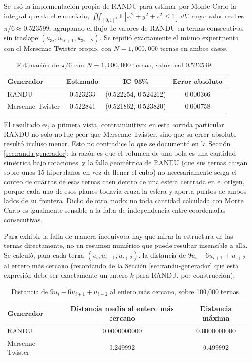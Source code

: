 \documentclass[11pt]{article}
\begin{document}
Se usó la implementación propia de RANDU para estimar por Monte Carlo la integral que da el enunciado, $\iiint_{[0,1]^3} \mathbf{1}[x^2+y^2+z^2\le 1]\,dV$, cuyo valor real es $\pi/6 \approx 0.523599$, agrupando el flujo de valores de RANDU en ternas consecutivas sin traslape $(u_{3i}, u_{3i+1}, u_{3i+2})$. Se repitió exactamente el mismo experimento con el Mersenne Twister propio, con $N=1{,}000{,}000$ ternas en ambos casos.

\begin{table}[H]
\centering
\begin{tabular}{lccc}
\toprule
Generador & Estimado & IC 95\% & Error absoluto \\
\midrule
RANDU & 0.523233 & (0.522254, 0.524212) & 0.000366 \\
Mersenne Twister & 0.522841 & (0.521862, 0.523820) & 0.000758 \\
\bottomrule
\end{tabular}
\caption{Estimación de $\pi/6$ con $N=1{,}000{,}000$ ternas, valor real $0.523599$.}
\end{table}

El resultado es, a primera vista, contraintuitivo: en esta corrida particular RANDU no solo no fue peor que Mersenne Twister, sino que su error absoluto resultó incluso menor. Esto no contradice lo que se documentó en la Sección \ref{sec:randu-generador}: la razón es que el volumen de una bola es una cantidad simétrica bajo rotaciones, y la falla geométrica de RANDU (que sus ternas caigan sobre unos 15 hiperplanos en vez de llenar el cubo) no necesariamente sesga el conteo de cuántas de esas ternas caen dentro de una esfera centrada en el origen, porque cada uno de esos planos todavía cruza la esfera y aporta puntos de ambos lados de su frontera. Dicho de otro modo: no toda cantidad calculada con Monte Carlo es igualmente sensible a la falta de independencia entre coordenadas consecutivas.

Para exhibir la falla de manera inequívoca hay que mirar la estructura de las ternas directamente, no un resumen numérico que puede resultar insensible a ella. Se calculó, para cada terna $(u_i,u_{i+1},u_{i+2})$, la distancia de $9u_i - 6u_{i+1} + u_{i+2}$ al entero más cercano (recordando de la Sección \ref{sec:randu-generador} que esta expresión debe ser exactamente un entero $k$ para RANDU, por construcción):

\begin{table}[H]
\centering
\begin{tabular}{lcc}
\toprule
Generador & Distancia media al entero más cercano & Distancia máxima \\
\midrule
RANDU & 0.0000000000 & 0.0000000000 \\
Mersenne Twister & 0.249992 & 0.499992 \\
\bottomrule
\end{tabular}
\caption{Distancia de $9u_i-6u_{i+1}+u_{i+2}$ al entero más cercano, sobre 100{,}000 ternas.}
\end{table}
\end{document}
